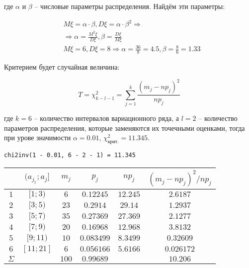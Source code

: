\documentclass{report}
\begin{document}
где $\alpha$ и $\beta$ -- числовые параметры распределения. Найдём эти параметры:

\begin{equation*}
\begin{split}
& M\xi = \alpha \cdot \beta, D\xi = \alpha \cdot \beta^2 \Rightarrow \\
& \Rightarrow \alpha = \frac{M^2\xi}{D\xi}, \beta = \frac{D\xi}{M\xi} \\
& M\xi = 6, D\xi = 8 \Rightarrow \alpha = \frac{36}{8} = 4.5, \beta = \frac{8}{6} = 1.33
\end{split}
\end{equation*}

Критерием будет случайная величина:

\begin{equation*}
T = \chi^2_{k - l - 1} = \sum \limits_{j=1}^k \frac{\left(m_j - np_j\right)^2}{np_j}
\end{equation*}

где $k = 6$ -- количество интервалов вариационного ряда, а $l = 2$ -- количество параметров распределения, которые заменяются их точечными оценками, тогда при урове значимости $\alpha = 0.01$,  $\chi^2_{\text{крит.}} = 11.345$.

\begin{lstlisting}
chi2inv(1 - 0.01, 6 - 2 - 1) = 11.345
\end{lstlisting}

\begin{table}[h]
\begin{tabularx}{\textwidth}{|c|c|c|c|c|c|}
\hline
    & $( a_{j_1}; a_j]$ & $m_j$ & $p_j$      & $np_j$   & $(m_j - np_j)^2 / np_j$ \\
\hline 
    $1$ & $[1;3)$       & $6$   & $0.12245$  & $12.245$ & $2.6187$ \\
    $2$ & $[3;5)$       & $23$  & $0.2914 $  & $29.14$  & $1.2937$ \\
    $3$ & $[5;7)$       & $35$  & $0.27369$  & $27.369$ & $2.1277$ \\
    $4$ & $[7;9)$       & $20$  & $0.16968$  & $12.968$ & $3.8132$ \\
    $5$ & $[9;11)$      & $10$  & $0.083499$ & $8.3499$ & $0.32609$ \\
    $6$ & $[11;21]$     & $6$   & $0.056166$ & $5.6166$ & $0.026172$ \\
$\Sigma$&               & $100$ & $0.99689$  &          & $10.206$ \\
\hline
\end{tabularx}
\end{table}
\end{document}
